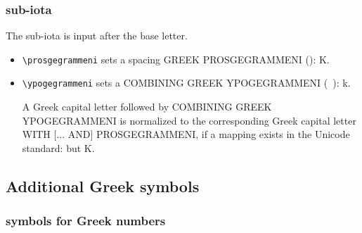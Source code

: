 \documentclass[a4paper]{article}
\begin{document}
\subsubsection{sub-iota}

The sub-iota is input after the base letter.

\begin{itemize}
\item \verb|\prosgegrammeni| sets a spacing GREEK PROSGEGRAMMENI
  (\prosgegrammeni): \textAlpha\prosgegrammeni{} K\prosgegrammeni{}.
  
\item \verb|\ypogegrammeni| sets a COMBINING GREEK YPOGEGRAMMENI
  (\ \ypogegrammeni{}): \textalpha\ypogegrammeni{} k\ypogegrammeni{}.

  A Greek capital letter followed by COMBINING GREEK YPOGEGRAMMENI is
  normalized to the corresponding Greek capital letter WITH [... AND]
  PROSGEGRAMMENI, if a mapping exists in the Unicode standard:
  \textAlpha\ypogegrammeni{} but K\ypogegrammeni{}.
\end{itemize}

\textAlpha\ypogegrammeni \textAlpha\prosgegrammeni
\MakeLowercase{\textAlpha\ypogegrammeni \textAlpha\prosgegrammeni}
\MakeUppercase{\textAlpha\ypogegrammeni \textAlpha\prosgegrammeni}

\textLambda\ypogegrammeni \textLambda\prosgegrammeni
\MakeLowercase{\textLambda\ypogegrammeni \textLambda\prosgegrammeni}
\MakeUppercase{\textLambda\ypogegrammeni \textLambda\prosgegrammeni}

\textalpha\ypogegrammeni \textalpha\prosgegrammeni
\MakeLowercase{\textalpha\ypogegrammeni \textalpha\prosgegrammeni}
\MakeUppercase{\textalpha\ypogegrammeni \textalpha\prosgegrammeni}


\subsection{Additional Greek symbols}

\subsubsection{symbols for Greek numbers}
\end{document}
